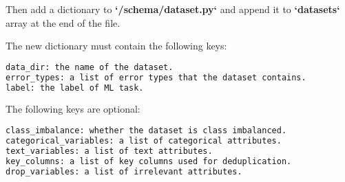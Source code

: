 
Then add a dictionary to \textbf{`/schema/dataset.py`} and append it to \textbf{`datasets`} array at the end of the file.

The new dictionary must contain the following keys:

\begin{lstlisting}[language=xml]
data_dir: the name of the dataset.
error_types: a list of error types that the dataset contains.
label: the label of ML task.
\end{lstlisting}

The following keys are optional:

\begin{lstlisting}[language=xml]
class_imbalance: whether the dataset is class imbalanced.
categorical_variables: a list of categorical attributes.
text_variables: a list of text attributes.
key_columns: a list of key columns used for deduplication.
drop_variables: a list of irrelevant attributes.
\end{lstlisting}

